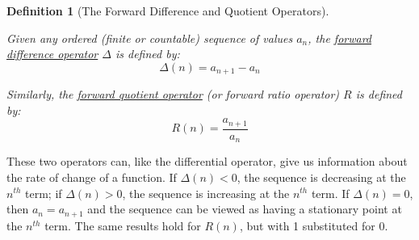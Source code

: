 \documentclass[12pt,a4paper]{article}
\newtheorem{defn}[thm]{Definition}
\begin{document}
\begin{defn}[The Forward Difference and Quotient Operators]$\;$\par\vspace{1cm}

Given any ordered (finite or countable) sequence of values $a_n$, the \underline{forward difference operator} $\Delta$ is defined by:
$$\Delta(n) = a_{n+1}-a_n$$

Similarly, the \underline{forward quotient operator} (or forward ratio operator) $R$ is defined by:
$$R(n) = \frac{a_{n+1}}{a_n}$$

\end{defn}

These two operators can, like the differential operator, give us information about the rate of change of a function. If $\Delta(n) < 0$, the sequence is decreasing at the $n^{th}$ term; if $\Delta(n) > 0$, the sequence is increasing at the $n^{th}$ term. If $\Delta(n) = 0$, then $a_n = a_{n+1}$ and the sequence can be viewed as having a stationary point at the $n^{th}$ term. The same results hold for $R(n)$, but with 1 substituted for 0.
\end{document}
